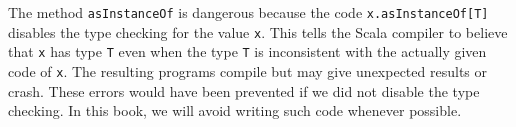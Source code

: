 The method \lstinline!asInstanceOf! is dangerous because the code
\lstinline!x.asInstanceOf[T]! disables the type checking for the
value \lstinline!x!. This tells the Scala compiler to believe that
\lstinline!x! has type \lstinline!T! even when the type \lstinline!T!
is inconsistent with the actually given code of \lstinline!x!. The
resulting programs compile but may give unexpected results or crash.
These errors would have been prevented if we did not disable the type
checking. In this book, we will avoid writing such code whenever possible.%
\begin{comment}
showing here this is equivalent in Scala just different syntax importantly
non theorems cannot be implemented in code some on theorems are statements
in logic that cannot be derived statements that are false or undereye
verbal examples of these statements are these for all a from one follows
a now this is certainly suspicious in terms of logic what if a were
false then we would have it from true false false that\textsf{'}s very obviously
wrong and we cannot implement a function of this type to implement
it we would have to take a unit argument and produce a value of type
a where a is arbitrary type but how can we produce a value of type
a of the type that we don't even know what it is and there is no data
for us to produce that value so it is impossible another example of
an impossible type is this type so from a plus B follows a if you
wanted to implement this function you would have to take a value of
disjunction type a plus B and return a value of type a but how can
you do that what exodus Junction type happens to contain B and no
a just B it cannot contain a if it contains a B it\textsf{'}s a disjunction
so then we don't have an A and then we again cannot produce any and
having a B which is a completely different arbitrary type doesn't
help us to produce me exactly the same reason shows why we cannot
produce an A a and B given a because that requires a B we cannot produce
and also this is not implementable because we are required to produce
an A but all we have is a function from A to B this function will
consume an A if given only this function cannot possibly produce an
A for us but we are required to produce an A as a result so we cannot
and also there is no proof of this formula in the logic so these examples
actually lead us to a natural question how can we decide given a certain
formula whether it is a theorem in logic and therefore whether it
can be implemented in code it is not obvious consider this example
can we write a function with this type in Scala it is not obvious

\end{comment}
